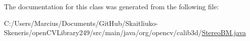 The documentation for this class was generated from the following file\+:\begin{DoxyCompactItemize}
\item 
C\+:/\+Users/\+Marcius/\+Documents/\+Git\+Hub/\+Skaitliuko-\/\+Skeneris/open\+C\+V\+Library249/src/main/java/org/opencv/calib3d/\mbox{\hyperlink{_stereo_b_m_8java}{Stereo\+B\+M.\+java}}\end{DoxyCompactItemize}
